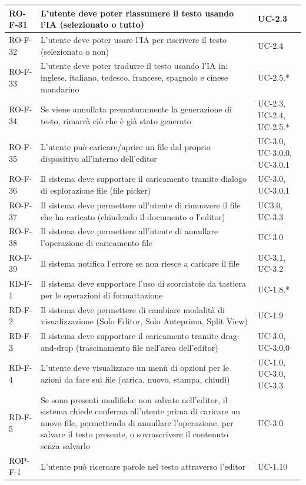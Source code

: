 \documentclass[11pt,a4paper]{article}
\begin{document}
\begin{longtable}{|p{}|>{\raggedright\arraybackslash}p{}|p{}|}
\hline
RO-F-31 & L'utente deve poter riassumere il testo usando l'IA (selezionato o tutto) & UC-2.3 \\
\hline
RO-F-32 & L'utente deve poter usare l'IA per riscrivere il testo (selezionato o non) & UC-2.4 \\
\hline
RO-F-33 & L'utente deve poter tradurre il testo usando l'IA in: inglese, italiano, tedesco, francese, spagnolo e cinese mandarino & UC-2.5.* \\
\hline
RO-F-34 & Se viene annullata prematuramente la generazione di testo, rimarrà ciò che è già stato generato & UC-2.3, UC-2.4, UC-2.5.* \\
\hline
RO-F-35 & L'utente può caricare/aprire un file dal proprio dispositivo all'interno dell'editor & UC-3.0, UC-3.0.0, UC-3.0.1 \\
\hline
RO-F-36 & Il sistema deve supportare il caricamento tramite dialogo di esplorazione file (file picker) & UC-3.0, UC-3.0.1 \\
\hline
RO-F-37 & Il sistema deve permettere all'utente di rimuovere il file che ha caricato (chiudendo il documento o l'editor) & UC3.0, UC-3.3 \\
\hline
RO-F-38 & Il sistema deve permettere all'utente di annullare l'operazione di caricamento file & UC-3.0 \\
\hline
RO-F-39 & Il sistema notifica l'errore se non riesce a caricare il file & UC-3.1, UC-3.2\\
\hline
RD-F-1 & Il sistema deve supportare l'uso di scorciatoie da tastiera per le operazioni di formattazione & UC-1.8.* \\
\hline
RD-F-2 & Il sistema deve permettere di cambiare modalità di visualizzazione (Solo Editor, Solo Anteprima, Split View) & UC-1.9 \\
\hline
RD-F-3 & Il sistema deve supportare il caricamento tramite drag-and-drop (trascinamento file nell'area dell'editor) & UC-3.0, UC-3.0.0 \\
\hline
RD-F-4 & L'utente deve visualizzare un menù di opzioni per le azioni da fare sul file (carica, nuovo, stampa, chiudi) & UC-1.0, UC-3.0, UC-3.3 \\
\hline
RD-F-5 & Se sono presenti modifiche non salvate nell'editor, il sistema chiede conferma all'utente prima di caricare un nuovo file, permettendo di annullare l'operazione, per salvare il testo presente, o sovrascrivere il contenuto senza salvarlo & UC-3.0 \\
\hline
ROP-F-1 & L'utente può ricercare parole nel testo attraverso l'editor & UC-1.10 \\

\end{longtable}
\end{document}
